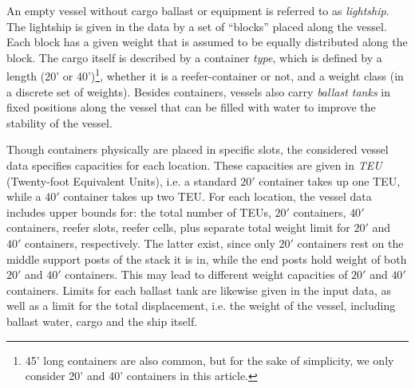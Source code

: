 An empty vessel without cargo ballast or equipment is referred to as \emph{lightship}.  The lightship is given in the data by a set of ``blocks'' placed along the vessel. Each block has a given weight that is assumed to be equally distributed along the block.
%
The cargo itself is described by a container \emph{type}, which is defined by a length (20' or 40')\footnote{45' long containers are also common, but for the sake of simplicity, we only consider 20' and 40' containers in this article.}, whether it is a reefer-container or not, and a weight class (in a discrete set of weights). 
Besides containers, vessels also carry \emph{ballast tanks} in fixed positions along the vessel that can be filled with water to improve the stability of the vessel.

Though containers physically are placed in specific slots, the considered vessel data specifies capacities for each location. These capacities are given in \emph{TEU} (Twenty-foot Equivalent Units), i.e. a standard $20'$ container takes up one TEU, while a $40'$ container takes up two TEU. For each location, the vessel data includes upper bounds for: the total number of TEUs, $20'$ containers, $40'$ containers, reefer slots, reefer cells, plus separate total weight limit for $20'$ and $40'$ containers, respectively. The latter exist, since only $20'$ containers rest on the middle support posts of the stack it is in, while the end posts hold weight of both $20'$ and $40'$ containers. This may lead to different weight capacities of $20'$ and $40'$ containers.
%
Limits for each ballast tank are likewise given in the input data, as well as a limit for the total displacement, i.e. the weight of the vessel, including ballast water, cargo and the ship itself. 

